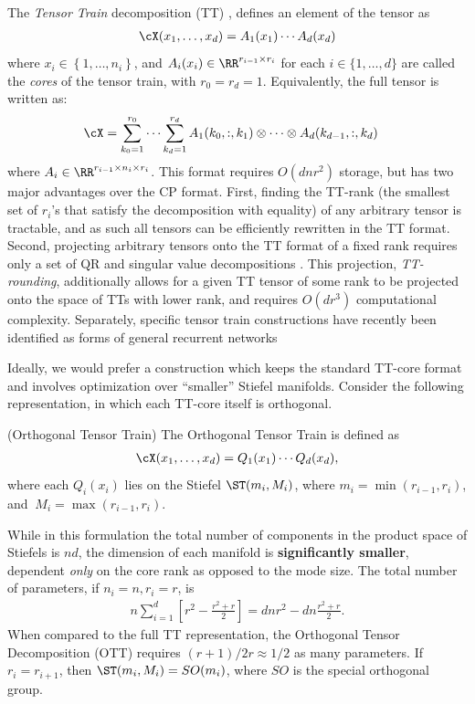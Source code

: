The \textit{Tensor Train} decomposition (TT) \citep{oseledets2011tensor}, defines an element of the tensor as
\begin{align}
\cX(x_1,\ldots,x_d) = A_1(x_1)\cdots A_d(x_d)
\end{align}
where $x_i \in \left\{1,\ldots, n_i\right\}$, and $A_i(x_i) \in \RR^{r_{i-1} \times r_{i}}$ for each $i \in \{1,\ldots,d\}$ are called the \textit{cores} of the tensor train, with $r_0 = r_d = 1$. Equivalently, the full tensor is written as:
\begin{align}\label{eq:fullTT}
\cX &= \sum_{k_0 = 1}^{r_0} \cdots \sum_{k_d = 1}^{r_d} A_1(k_0,:,k_1) \otimes \cdots \otimes A_d(k_{d-1},:,k_d) 
\end{align}
where $A_i \in \RR^{r_{i-1}\times n_i \times r_i} $. This format requires $O(dnr^2)$ storage, but has two major advantages over the CP format. First, finding the TT-rank (the smallest set of $r_i$'s that satisfy the decomposition with equality) of any arbitrary tensor is tractable, and as such all tensors can be efficiently rewritten in the TT format. Second, projecting arbitrary tensors onto the TT format of a fixed rank requires only a set of QR and singular value decompositions \citep{oseledets2011tensor}. This projection, \textit{TT-rounding}, additionally allows for a given TT tensor of some rank to be projected onto the space of TTs with lower rank, and requires $O(dr^3)$ computational complexity. Separately, specific tensor train constructions have recently been identified as forms of general recurrent networks \citep{khrulkov2018generalized}

Ideally, we would prefer a construction which keeps the standard TT-core format and involves optimization over ``smaller'' Stiefel manifolds. Consider the following representation, in which each TT-core itself is orthogonal.
\begin{definition}\label{def:ott}(Orthogonal Tensor Train)
	The Orthogonal Tensor Train is defined as
	\begin{align}
	\cX(x_1,\ldots,x_d) = Q_1(x_1) \cdots Q_d(x_d),
	\end{align}
	where each $Q_i(x_i)$ lies on the Stiefel $\ST(m_i, M_i)$, where $m_i = \min(r_{i-1},r_i)$, and  $\ M_i = \max(r_{i-1},r_i)$.
\end{definition}
While in this formulation the total number of components in the product space of Stiefels is $nd$, the dimension of each manifold is {\bf significantly smaller},
dependent {\em only} on the core rank as opposed to the mode size.
The total number of parameters, if $n_i =n, r_i = r$, is
\begin{align}
n \sum_{i=1}^d \left[ r^2 - \frac{r^2 + r}{2}\right] = d n r^2 - dn\frac{r^2 + r}{2}.
\end{align}
When compared to the full TT representation,
the Orthogonal Tensor Decomposition (OTT) requires
$(r+1)/2r \approx 1/2$ as many parameters.
If $r_i=r_{i+1}$, then $\ST(m_i, M_i) = SO(m_i)$, where $SO$ is the special orthogonal group.

